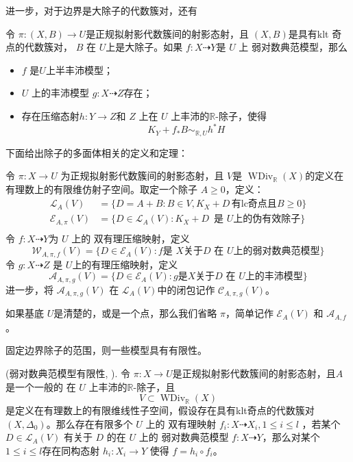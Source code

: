 进一步，对于边界是大除子的代数簇对，还有
\begin{lemma}\cite[Lemma 3.9.3]{BCHM10} 令 $ \pi:(X,B)\to U $是正规拟射影代数簇间的射影态射，且 $(X, B)$是具有klt 奇点的代数簇对，  $B$ 在 $U$上是大除子。如果 $f:X\dashrightarrow Y$是 $U$ 上 弱对数典范模型，那么
  \begin{itemize}
    \item $f$ 是$U$上半丰沛模型；
    \item  $U$ 上的丰沛模型  $g:X \dashrightarrow Z$存在；
    \item  存在压缩态射$h:Y\to Z$和 $Z$ 上在 $U$ 上丰沛的$\mathbb{R}$-除子，使得 
      \[ K_{Y}+f_*B\sim_{\mathbb{R},U} h^*H \]
  \end{itemize}
\end{lemma}
下面给出除子的多面体相关的定义和定理：
\begin{definition}\label{polytopeofdivisor}
  \cite[Definition 1.1.4]{BCHM10} 令 $ \pi: X\to U $ 为正规拟射影代数簇间的射影态射，且 $ V $是 $ \operatorname{WDiv}_{\mathbb{R}}(X) $的定义在有理数上的有限维仿射子空间。取定一个除子 $ A\geqslant 0 $，定义：
  \[
    \begin{aligned}
      \mathcal{L}_A(V)       & =\{D=A+B:B \in V,  K_X+D\, \text{有lc奇点且} B\geqslant0 \} \\
    \mathcal{E}_{A,\pi}(V) & =\{D\in \mathcal{L}_A(V): K_X+D\, \text{ 是 } U \text{上的伪有效除子}\}  \\
    \end{aligned}
  \]
  令 $ f:X \dashrightarrow Y$为 $U$ 上的 双有理压缩映射，定义
  \[ \mathcal{W}_{A,\pi,f}(V)=\{D\in \mathcal{E}_{A}(V): f \text{是   } X \text{关于}D \text{ 在 }U \text{上的弱对数典范模型}\} \]
  令 $g:X\dashrightarrow Z  $ 是 $ U $上的有理压缩映射，定义
  \[ \mathcal{A}_{A,\pi,g}(V)=\{D\in \mathcal{E}_{A}(V): g \text{是} X \text{关于}D\text{ 在 }U \text{上的丰沛模型}\} \]
  进一步，将 $ \mathcal{A}_{A,\pi,g}(V) $ 在 $\mathcal{L}_{A}(V)$中的闭包记作 $ \mathcal{C}_{A,\pi,g}(V) $。

  如果基底 $U$是清楚的，或是一个点，那么我们省略 $\pi$，简单记作 $\mathcal{E}_{A}(V)$ 和 $\mathcal{A}_{A,f}$。
\end{definition}
固定边界除子的范围，则一些模型具有有限性。
\begin{theorem}\label{finitewlcm}
  (弱对数典范模型有限性, \cite[Theorem E]{BCHM10}).
  令 $\pi: X\to U$是正规拟射影代数簇间的射影态射，且$A$是一个一般的 在 $U$ 上丰沛的$\mathbb{R}$-除子，且
    \[ V \subset \operatorname{WDiv}_{\mathbb{R}}(X) \]
  是定义在有理数上的有限维线性子空间，假设存在具有klt奇点的代数簇对 $(X,\Delta_{0})$。那么存在有限多个 $U$ 上的 双有理映射 $f_{i}:X \dashrightarrow X_{i},1\leqslant i\leqslant l$ ，若某个 $D \in \mathcal{L}_{A}(V)$ 有关于 $D$ 的在 $U$ 上的  弱对数典范模型 $f:X \dashrightarrow  Y$，那么对某个$1\leqslant i\leqslant l$存在同构态射  $h_{i}:X_{i} \to Y$ 使得 $f=h_{i}\circ f_{i}$。
\end{theorem}
